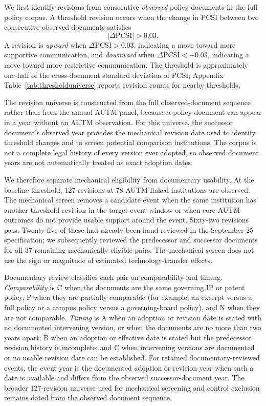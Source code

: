 We first identify revisions from consecutive \emph{observed} policy documents in the full policy corpus. A threshold revision occurs when the change in PCSI between two consecutive observed documents satisfies
\[
|\Delta\mathrm{PCSI}|>0.03.
\]
A revision is \emph{upward} when $\Delta\mathrm{PCSI}>0.03$, indicating a move toward more supportive communication, and \emph{downward} when $\Delta\mathrm{PCSI}<-0.03$, indicating a move toward more restrictive communication. The threshold is approximately one-half of the cross-document standard deviation of PCSI; Appendix Table~\ref{tab:thresholduniverse} reports revision counts for nearby thresholds.

The revision universe is constructed from the full observed-document sequence rather than from the annual AUTM panel, because a policy document can appear in a year without an AUTM observation. For this universe, the successor document's observed year provides the mechanical revision date used to identify threshold changes and to screen potential comparison institutions. The corpus is not a complete legal history of every version ever adopted, so observed document years are not automatically treated as exact adoption dates.

We therefore separate mechanical eligibility from documentary usability. At the baseline threshold, 127 revisions at 78 AUTM-linked institutions are observed. The mechanical screen removes a candidate event when the same institution has another threshold revision in the target event window or when core AUTM outcomes do not provide usable support around the event. Sixty-two revisions pass. Twenty-five of these had already been hand-reviewed in the September-25 specification; we subsequently reviewed the predecessor and successor documents for all 37 remaining mechanically eligible pairs. The mechanical screen does not use the sign or magnitude of estimated technology-transfer effects.

Documentary review classifies each pair on comparability and timing. \emph{Comparability} is C when the documents are the same governing IP or patent policy, P when they are partially comparable (for example, an excerpt versus a full policy or a campus policy versus a governing-board policy), and N when they are not comparable. \emph{Timing} is A when an adoption or revision date is stated with no documented intervening version, or when the documents are no more than two years apart; B when an adoption or effective date is stated but the predecessor revision history is incomplete; and C when intervening versions are documented or no usable revision date can be established. For retained documentary-reviewed events, the event year is the documented adoption or revision year when such a date is available and differs from the observed successor-document year. The broader 127-revision universe used for mechanical screening and control exclusion remains dated from the observed document sequence.

